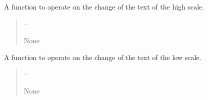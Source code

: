 \documentclass[letterpaper,11pt,english]{sphinxmanual}
\begin{document}
\begin{savenotes}
\begin{fulllineitems}
\begin{savenotes}\begin{fulllineitems}
\label{\detokenize{code/opihiexarata.gui.selector:opihiexarata.gui.selector.TargetSelectorWindow.__connect_line_edit_dynamic_scale_high}}
\pysigstartsignatures
{}
\pysigstopsignatures
\sphinxAtStartPar
A function to operate on the change of the text of the high scale.
\begin{quote}\begin{description}
\sphinxAtStartPar
{} – 

\sphinxAtStartPar
None

\end{description}\end{quote}

\end{fulllineitems}\end{savenotes}


\begin{savenotes}\begin{fulllineitems}
\label{\detokenize{code/opihiexarata.gui.selector:opihiexarata.gui.selector.TargetSelectorWindow.__connect_line_edit_dynamic_scale_low}}
\pysigstartsignatures
{}
\pysigstopsignatures
\sphinxAtStartPar
A function to operate on the change of the text of the low scale.
\begin{quote}\begin{description}
\sphinxAtStartPar
{} – 

\sphinxAtStartPar
None

\end{description}\end{quote}

\end{fulllineitems}\end{savenotes}


\end{fulllineitems}
\end{savenotes}
\end{document}
